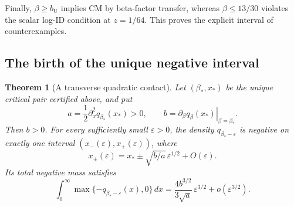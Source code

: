\documentclass[11pt,a4paper]{article}
\numberwithin{equation}{section}
\newtheorem{theorem}{Theorem}[section]
\theoremstyle{definition}\newtheorem{definition}[theorem]{Definition}
\theoremstyle{remark}\newtheorem{remark}[theorem]{Remark}
\newcommand{\bU}{b_{\mathrm U}}
\begin{document}
Finally, \(\beta\ge\bU\) implies CM by beta-factor transfer,
whereas \(\beta\le13/30\) violates the scalar log-ID condition
at \(z=1/64\). This proves the explicit interval of counterexamples.


\subsection{The birth of the unique negative interval}
\label{contact:section}

\begin{theorem}[A transverse quadratic contact]
\label{contact:law}
Let \((\beta_*,x_*)\) be the unique critical pair certified above,
and put
\[
 a=\frac12\partial_x^2q_{\beta_*}(x_*)>0,
 \qquad b=\left.\partial_\beta q_\beta(x_*)\right|_{\beta=\beta_*}.
\]
Then \(b>0\).  For every sufficiently small \(\varepsilon>0\),
the density \(q_{\beta_*-\varepsilon}\) is negative on exactly one
interval \((x_-(\varepsilon),x_+(\varepsilon))\), where
\begin{equation}\label{contact:roots}
 x_\pm(\varepsilon)
      =x_*\pm\sqrt{b/a}\,\varepsilon^{1/2}+O(\varepsilon).
\end{equation}
Its total negative mass satisfies
\begin{equation}\label{contact:negative-mass}
 \int_0^\infty\max\{-q_{\beta_*-\varepsilon}(x),0\}\,dx
       =\frac{4b^{3/2}}{3\sqrt a}\,\varepsilon^{3/2}
                                  +o(\varepsilon^{3/2}).
\end{equation}
\end{theorem}
\end{document}

